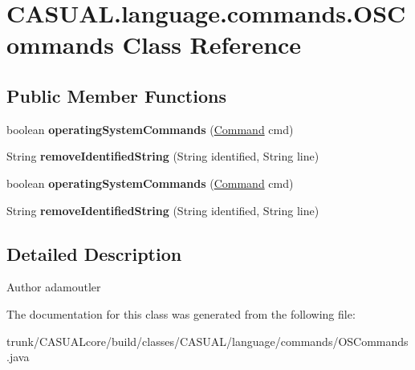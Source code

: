\hypertarget{class_c_a_s_u_a_l_1_1language_1_1commands_1_1_o_s_commands}{\section{C\-A\-S\-U\-A\-L.\-language.\-commands.\-O\-S\-Commands Class Reference}
\label{class_c_a_s_u_a_l_1_1language_1_1commands_1_1_o_s_commands}
}
\subsection*{Public Member Functions}
\begin{DoxyCompactItemize}
\item 
\hypertarget{class_c_a_s_u_a_l_1_1language_1_1commands_1_1_o_s_commands_a561d6f1da6f45462e2cd1476adec6c79}{boolean {\bfseries operating\-System\-Commands} (\hyperlink{class_c_a_s_u_a_l_1_1language_1_1_command}{Command} cmd)}\label{class_c_a_s_u_a_l_1_1language_1_1commands_1_1_o_s_commands_a561d6f1da6f45462e2cd1476adec6c79}

\item 
\hypertarget{class_c_a_s_u_a_l_1_1language_1_1commands_1_1_o_s_commands_a0ba798bff102a5fed760c35a89b49576}{String {\bfseries remove\-Identified\-String} (String identified, String line)}\label{class_c_a_s_u_a_l_1_1language_1_1commands_1_1_o_s_commands_a0ba798bff102a5fed760c35a89b49576}

\item 
\hypertarget{class_c_a_s_u_a_l_1_1language_1_1commands_1_1_o_s_commands_a561d6f1da6f45462e2cd1476adec6c79}{boolean {\bfseries operating\-System\-Commands} (\hyperlink{class_c_a_s_u_a_l_1_1language_1_1_command}{Command} cmd)}\label{class_c_a_s_u_a_l_1_1language_1_1commands_1_1_o_s_commands_a561d6f1da6f45462e2cd1476adec6c79}

\item 
\hypertarget{class_c_a_s_u_a_l_1_1language_1_1commands_1_1_o_s_commands_a0ba798bff102a5fed760c35a89b49576}{String {\bfseries remove\-Identified\-String} (String identified, String line)}\label{class_c_a_s_u_a_l_1_1language_1_1commands_1_1_o_s_commands_a0ba798bff102a5fed760c35a89b49576}

\end{DoxyCompactItemize}


\subsection{Detailed Description}
\begin{DoxyAuthor}{Author}
adamoutler 
\end{DoxyAuthor}


The documentation for this class was generated from the following file\-:\begin{DoxyCompactItemize}
\item 
trunk/\-C\-A\-S\-U\-A\-Lcore/build/classes/\-C\-A\-S\-U\-A\-L/language/commands/O\-S\-Commands.\-java\end{DoxyCompactItemize}
